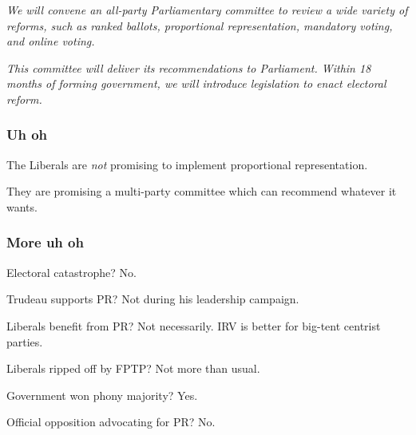 \documentclass[14pt,t,hyperref={colorlinks=true,urlcolor=red}]{beamer}
\begin{document}
\begin{frame}

\textit{
We will convene an all-party Parliamentary committee to review a wide
variety of reforms, such as ranked ballots, proportional
representation, mandatory voting, and online voting.
}

\textit{
This committee will deliver its recommendations to Parliament. Within
18 months of forming government, we will introduce legislation to
enact electoral reform.
}


\end{frame}



\begin{frame}
\frametitle{Uh oh}

The Liberals are \textit{not} promising to implement proportional representation. 

They are promising a multi-party committee which can recommend
whatever it wants. 


\end{frame}


\begin{frame}
\frametitle{More uh oh}

\begin{itemize*}

\item Electoral catastrophe? No.

\item Trudeau supports PR? Not during his leadership campaign.

\item Liberals benefit from PR? Not necessarily. 
IRV is better for big-tent centrist parties.

\item Liberals ripped off by FPTP? Not more than usual.

\item Government won phony majority? Yes.

\item Official opposition advocating for PR? No.

\end{itemize*}


\end{frame}
\end{document}
